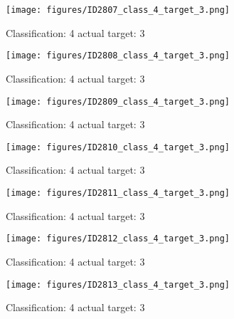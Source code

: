 \begin{figure}[h!]
\begin{center}
\texttt{[image: figures/ID2807\_class\_4\_target\_3.png]}
\end{center}
\caption{ Classification: 4 actual target: 3}
\label{fig:ID2807_class_4_target_3}
\end{figure}
\begin{figure}[h!]
\begin{center}
\texttt{[image: figures/ID2808\_class\_4\_target\_3.png]}
\end{center}
\caption{ Classification: 4 actual target: 3}
\label{fig:ID2808_class_4_target_3}
\end{figure}
\begin{figure}[h!]
\begin{center}
\texttt{[image: figures/ID2809\_class\_4\_target\_3.png]}
\end{center}
\caption{ Classification: 4 actual target: 3}
\label{fig:ID2809_class_4_target_3}
\end{figure}
\begin{figure}[h!]
\begin{center}
\texttt{[image: figures/ID2810\_class\_4\_target\_3.png]}
\end{center}
\caption{ Classification: 4 actual target: 3}
\label{fig:ID2810_class_4_target_3}
\end{figure}
\begin{figure}[h!]
\begin{center}
\texttt{[image: figures/ID2811\_class\_4\_target\_3.png]}
\end{center}
\caption{ Classification: 4 actual target: 3}
\label{fig:ID2811_class_4_target_3}
\end{figure}
\begin{figure}[h!]
\begin{center}
\texttt{[image: figures/ID2812\_class\_4\_target\_3.png]}
\end{center}
\caption{ Classification: 4 actual target: 3}
\label{fig:ID2812_class_4_target_3}
\end{figure}
\begin{figure}[h!]
\begin{center}
\texttt{[image: figures/ID2813\_class\_4\_target\_3.png]}
\end{center}
\caption{ Classification: 4 actual target: 3}
\label{fig:ID2813_class_4_target_3}
\end{figure}
